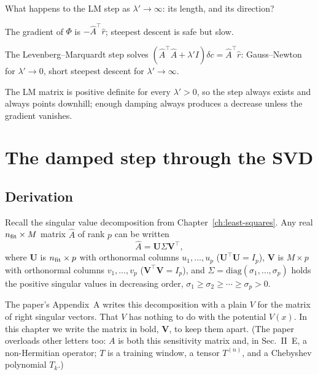\begin{checkpoint}
What happens to the LM step as $\lambda'\to\infty$: its length, and its direction?
\end{checkpoint}

\begin{keyideas}
\item The gradient of $\Phi$ is $-\hat A^\top\hat r$; steepest descent is safe but slow.
\item The Levenberg--Marquardt step solves $(\hat A^\top\hat A+\lambda'I)\delta c=\hat A^\top\hat r$: Gauss--Newton for $\lambda'\to0$, short steepest descent for $\lambda'\to\infty$.
\item The LM matrix is positive definite for every $\lambda'>0$, so the step always exists and always points downhill; enough damping always produces a decrease unless the gradient vanishes.
\end{keyideas}

\section{The damped step through the SVD}\label{sec:fitting-svd}

\subsection{Derivation}

Recall the singular value decomposition from Chapter~\ref{ch:least-squares}. Any real $n_{\rm fit}\times M$ matrix $\hat A$ of rank $p$ can be written
\begin{equation}
\hat A=\bm U\Sigma\bm V^\top,
\label{eq:fitting-svdA}
\end{equation}
where $\bm U$ is $n_{\rm fit}\times p$ with orthonormal columns $u_1,\dots,u_p$ ($\bm U^\top\bm U=I_p$), $\bm V$ is $M\times p$ with orthonormal columns $v_1,\dots,v_p$ ($\bm V^\top\bm V=I_p$), and $\Sigma=\mathrm{diag}(\sigma_1,\dots,\sigma_p)$ holds the positive singular values in decreasing order, $\sigma_1\ge\sigma_2\ge\cdots\ge\sigma_p>0$.

\begin{pitfall}
The paper's Appendix~A writes this decomposition with a plain $V$ for the matrix of right singular vectors. That $V$ has nothing to do with the potential $V(x)$. In this chapter we write the matrix in bold, $\bm V$, to keep them apart. (The paper overloads other letters too: $A$ is both this sensitivity matrix and, in Sec.~II~E, a non-Hermitian operator; $T$ is a training window, a tensor $T^{(n)}$, and a Chebyshev polynomial $T_k$.)
\end{pitfall}

